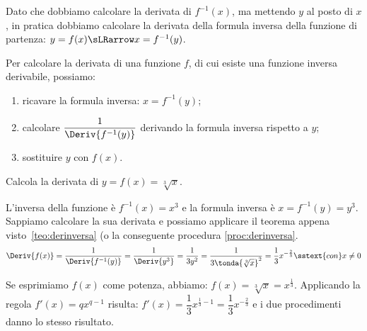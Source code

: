 \begin{osservazione}
Dato che dobbiamo calcolare la derivata di \(f^{-1}(x)\), 
ma mettendo \(y\) al posto di \(x\), in pratica dobbiamo calcolare la derivata 
della formula inversa della funzione di partenza: 
\(y = f(x) \sLRarrow x = f^{-1}(y)\).
\end{osservazione}


\begin{procedura}
\label{proc:derinversa}
Per calcolare la derivata di una funzione \(f\), di cui esiste una funzione 
inversa derivabile, possiamo:
\begin{enumerate} [nosep]
\item ricavare la formula inversa: \(x = f^{-1}(y)\);
\item calcolare \(\dfrac{1}{\Deriv{f^{-1}(y)}}\) 
derivando la formula inversa rispetto a \(y\);
\item sostituire \(y\) con \(f(x)\).
\end{enumerate}
\end{procedura}

\begin{esempio}
Calcola la derivata di \(y=f(x)=\sqrt[3]{x}\).

L'inversa della funzione è \(f^{-1}(x) = x^3\) 
e la formula inversa è \(x = f^{-1}(y) = y^3\). \\
Sappiamo calcolare la sua derivata e possiamo applicare il teorema 
appena visto~\ref{teo:derinversa} (o la conseguente procedura 
\ref{proc:derinversa}. 
\[\Deriv{f(x)} = \dfrac{1}{\Deriv{f^{-1}(y)}} = 
  \dfrac{1}{\Deriv{y^3}} = \dfrac{1}{3y^2} = 
  \dfrac{1}{3 \tonda{\sqrt[3]{x}}^2} =
  \dfrac{1}{3} x^{-\frac{2}{3}} \sstext{con} x \ne 0\]
\end{esempio}
\begin{osservazione}
Se esprimiamo \(f(x)\) come potenza, abbiamo:
\(f(x)=\sqrt[3]{x}=x^\frac{1}{3}\). 
Applicando la regola \(f'(x)= q x^{q -1}\) risulta: 
\(f'(x) = \dfrac{1}{3}x^{\frac{1}{3} -1} = \dfrac{1}{3}x^{-\frac{2}{3}}\)
e i due procedimenti danno lo stesso risultato.
\end{osservazione}

